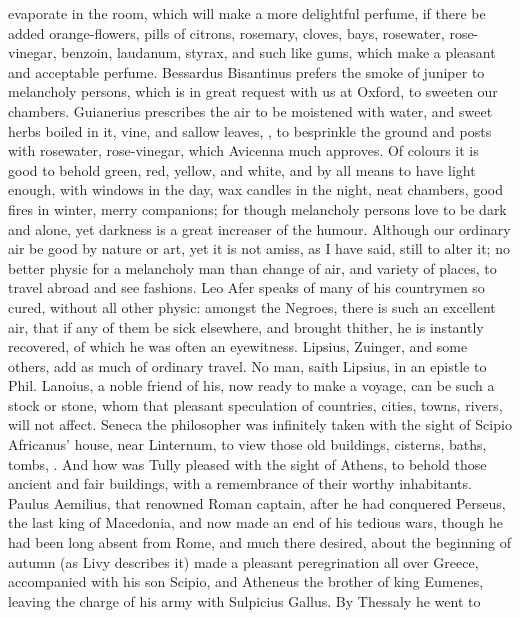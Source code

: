 {evaporate in the room, which will make a more delightful perfume, if
there be added orange-flowers, pills of citrons, rosemary, cloves,
bays, rosewater, rose-vinegar, benzoin, laudanum, styrax, and such like
gums, which make a pleasant and acceptable perfume. Bessardus
Bisantinus prefers the smoke of juniper to melancholy persons, which is
in great request with us at Oxford, to sweeten our chambers.
Guianerius prescribes the air to be moistened with water, and
sweet herbs boiled in it, vine, and sallow leaves, \etc{},  to
besprinkle the ground and posts with rosewater, rose-vinegar, which
Avicenna much approves. Of colours it is good to behold green, red,
yellow, and white, and by all means to have light enough, with windows
in the day, wax candles in the night, neat chambers, good fires in
winter, merry companions; for though melancholy persons love to be dark
and alone, yet darkness is a great increaser of the humour.
Although our ordinary air be good by nature or art, yet it is not
amiss, as I have said, still to alter it; no better physic for a
melancholy man than change of air, and variety of places, to travel
abroad and see fashions. Leo Afer speaks of many of his
countrymen so cured, without all other physic: amongst the Negroes,
there is such an excellent air, that if any of them be sick elsewhere,
and brought thither, he is instantly recovered, of which he was often
an eyewitness. Lipsius, Zuinger, and some others, add as much of
ordinary travel. No man, saith Lipsius, in an epistle to Phil. Lanoius,
a noble friend of his, now ready to make a voyage, can be such a
stock or stone, whom that pleasant speculation of countries, cities,
towns, rivers, will not affect.  Seneca the philosopher was
infinitely taken with the sight of Scipio Africanus' house, near
Linternum, to view those old buildings, cisterns, baths, tombs, \etc{}. And
how was Tully pleased with the sight of Athens, to behold those
ancient and fair buildings, with a remembrance of their worthy
inhabitants. Paulus Aemilius, that renowned Roman captain, after he had
conquered Perseus, the last king of Macedonia, and now made an end of
his tedious wars, though he had been long absent from Rome, and much
there desired, about the beginning of autumn (as Livy describes
it) made a pleasant peregrination all over Greece, accompanied with his
son Scipio, and Atheneus the brother of king Eumenes, leaving the
charge of his army with Sulpicius Gallus. By Thessaly he went to
}
